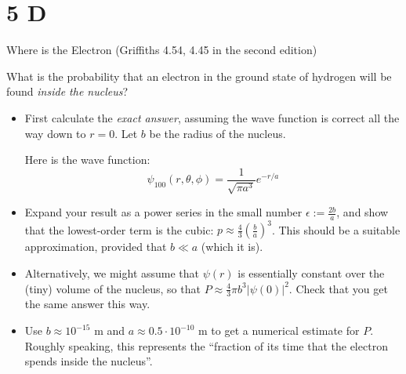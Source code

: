 \documentclass{article}
\begin{document}
\newpage

\section*{5 D}
\begin{ques}\label{q5}
Where is the Electron (Griffiths 4.54, 4.45 in the second edition)

What is the probability that an electron in the ground state of hydrogen will be found \emph{inside the nucleus}?
\begin{itemize}
    \item[(a)] First calculate the \emph{exact answer}, assuming the wave function is correct all the way down to $r=0$. Let $b$ be the radius of the nucleus.
    
    Here is the wave function:
    $$\psi_{100}(r,\theta,\phi) = \frac{1}{\sqrt{\pi a^3}}e^{-r/a}$$ 
    \item[(b)] Expand your result as a power series in the small number $\epsilon := \frac{2b}{a}$, and show that the lowest-order term is the cubic: $p \approx \frac{4}{3}\left(\frac{b}{a}\right)^3$. This should be a suitable approximation, provided that $b\ll a$ (which it is).
    \item[(c)] Alternatively, we might assume that $\psi(r)$ is essentially constant over the (tiny) volume of the nucleus, so that $P\approx \frac{4}{3}\pi b^3|\psi(0)|^2$. Check that you get the same answer this way.
    \item[(d)] Use $b\approx 10^{-15}$ m and $a\approx 0.5\cdot 10^{-10}$ m to get a numerical estimate for $P$. Roughly speaking, this represents the ``fraction of its time that the electron spends inside the nucleus''.   
\end{itemize}
\end{ques}
\end{document}
